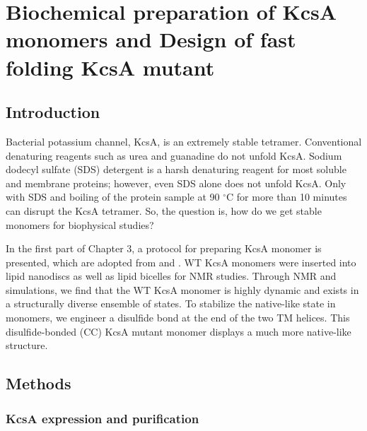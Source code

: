 
\chapter{Biochemical preparation of KcsA monomers and Design of fast folding KcsA mutant}
\section{Introduction}
Bacterial potassium channel, KcsA, is an extremely stable tetramer. \citep{valiyaveetil2002semi, barrera2005, barrera2008, heginbotham1997, valiyaveetil2002lipids}	Conventional denaturing reagents such as urea and guanadine do not unfold KcsA. \citep{valiyaveetil2002lipids} Sodium dodecyl sulfate (SDS) detergent is a harsh denaturing reagent for most soluble and membrane proteins; however, even SDS alone does not unfold KcsA. Only with SDS and boiling of the protein sample at 90 $^{\circ}$C for more than 10 minutes can disrupt the KcsA tetramer. So, the question is, how do we get stable monomers for biophysical studies?

In the first part of Chapter 3, a protocol for preparing KcsA monomer is presented, which are adopted from \citep{shenkarev2013} and \citep{devaraneni2011}. WT KcsA monomers were inserted into lipid nanodiscs as well as lipid bicelles for NMR studies. Through NMR and simulations, we find that the WT KcsA monomer is highly dynamic and exists in a structurally diverse ensemble of states. To stabilize the native-like state in monomers, we engineer a disulfide bond at the end of the two TM helices. This disulfide-bonded (CC) KcsA mutant monomer displays a much more native-like structure.

\section{Methods}
\subsection{KcsA expression and purification}
